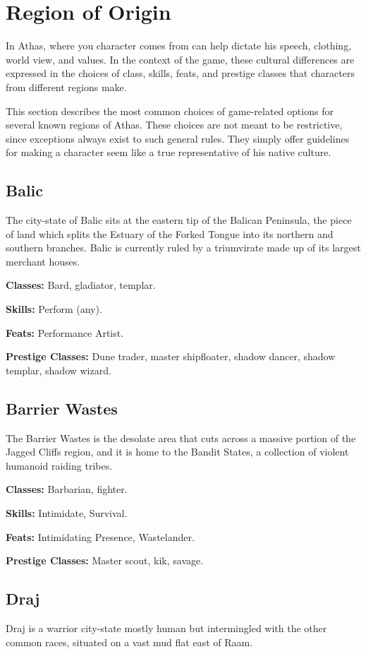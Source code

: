 \section{Region of Origin}

In Athas, where you character comes from can help dictate his speech, clothing, world view, and values. In the context of the game, these cultural differences are expressed in the choices of class, skills, feats, and prestige classes that characters from different regions make.

This section describes the most common choices of game-related options for several known regions of Athas. These choices are not meant to be restrictive, since exceptions always exist to such general rules. They simply offer guidelines for making a character seem like a true representative of his native culture.

\subsection{Balic}
The city-state of Balic sits at the eastern tip of the Balican Peninsula, the piece of land which splits the Estuary of the Forked Tongue into its northern and southern branches. Balic is currently ruled by a triumvirate made up of its largest merchant houses.

\textbf{Classes:} Bard, gladiator, templar.

\textbf{Skills:} Perform (any).

\textbf{Feats:} Performance Artist.

\textbf{Prestige Classes:} Dune trader, master shipfloater, shadow dancer, shadow templar, shadow wizard.

\subsection{Barrier Wastes}
The Barrier Wastes is the desolate area that cuts across a massive portion of the Jagged Cliffs region, and it is home to the Bandit States, a collection of violent humanoid raiding tribes.

\textbf{Classes:} Barbarian, fighter.

\textbf{Skills:} Intimidate, Survival.

\textbf{Feats:} Intimidating Presence, Wastelander.

\textbf{Prestige Classes:} Master scout, kik, savage.

\subsection{Draj}
Draj is a warrior city-state mostly human but intermingled with the other common races, situated on a vast mud flat east of Raam.

